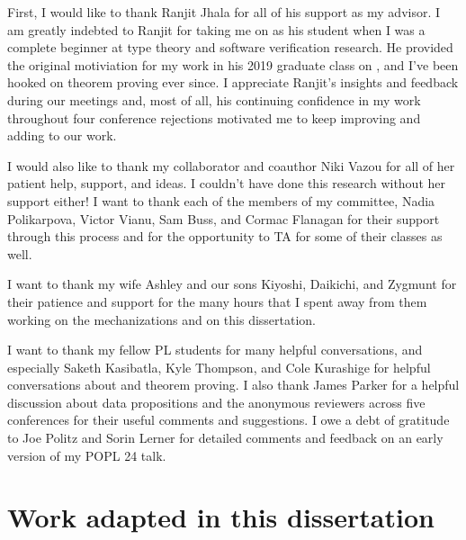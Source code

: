 \begin{frontmatter}
%
%
\begin{acknowledgements}
    First, I would like to thank Ranjit Jhala for all of his support as
    my advisor. 
    I am greatly indebted to Ranjit for taking me on as his student when I 
    was a complete beginner at type theory and software verification
    research.
    He provided the original motiviation for my work in his 2019 
    graduate class on \lh, and I've been hooked on theorem proving ever since.
    I appreciate Ranjit's insights and feedback during our 
    meetings and, most of all, his continuing confidence in my work 
    throughout four conference rejections motivated me to keep improving 
    and adding to our work.

    I would also like to thank my collaborator and coauthor Niki Vazou
    for all of her patient help, support, and ideas. I couldn't have 
    done this research without her support either!
    I want to thank each of the members of my committee, Nadia Polikarpova,
    Victor Vianu, Sam Buss, and Cormac Flanagan for their support through 
    this process and for the opportunity to TA
    for some of their classes as well.

    I want to thank my wife Ashley and our sons Kiyoshi, Daikichi,
    and Zygmunt for their patience and support for the many hours that
    I spent 
    away from them working on the mechanizations and on this dissertation.

    I want to thank my fellow PL students for many helpful conversations, 
    and especially Saketh Kasibatla, Kyle Thompson, and Cole Kurashige
    for helpful conversations about \coq and theorem proving.
    I also thank James Parker for a helpful discussion 
    about data propositions and the anonymous reviewers across five 
    conferences for their useful comments and suggestions. 
    I owe a debt of gratitude to Joe Politz and Sorin Lerner for detailed
    comments and feedback on an early version of my POPL 24 talk.

    \section*{Work adapted in this dissertation}


\end{acknowledgements}
\end{frontmatter}
